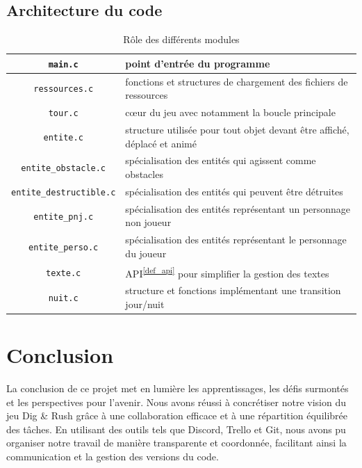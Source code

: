 \documentclass[a4paper,12pt]{article}
\newcommand\refsuscrite[1]{\textsuperscript{\ref{#1}}}
\begin{document}
\subsection{Architecture du code}

\begin{table}[H]
    \centering
    \begin{tabular}{c p{}}
	\toprule
	\texttt{main.c}			    & point d’entrée du programme	\\
	\midrule
	\texttt{ressources.c}		    & fonctions et structures de chargement des fichiers de ressources	\\
	\midrule
	\texttt{tour.c}			    & cœur du jeu avec notamment la boucle principale	\\
	\midrule
	\texttt{entite.c}                   & structure utilisée pour tout objet devant être affiché, déplacé et animé  \\
	\midrule
	\texttt{entite\_obstacle.c}          & spécialisation des entités qui agissent comme obstacles  \\
	\midrule
	\texttt{entite\_destructible.c}	    & spécialisation des entités qui peuvent être détruites \\
	\midrule
	\texttt{entite\_pnj.c}		    & spécialisation des entités représentant un personnage non joueur	\\
	\midrule
	\texttt{entite\_perso.c}		    & spécialisation des entités représentant le personnage du joueur	\\
	\midrule
	\texttt{texte.c}		    & API\refsuscrite{def_api} pour simplifier la gestion des textes   \\
	\midrule
	\texttt{nuit.c}			    & structure et fonctions implémentant une transition jour/nuit \\
	\bottomrule
    \end{tabular}
    \caption{Rôle des différents modules}
\end{table}

\section{Conclusion}

La conclusion de ce projet met en lumière les apprentissages, les défis surmontés et les perspectives pour l'avenir. Nous avons réussi à concrétiser notre vision du jeu Dig \& Rush grâce à une collaboration efficace et à une répartition équilibrée des tâches. En utilisant des outils tels que Discord, Trello et Git, nous avons pu organiser notre travail de manière transparente et coordonnée, facilitant ainsi la communication et la gestion des versions du code.
\end{document}
